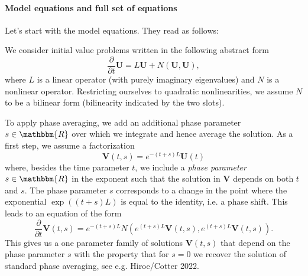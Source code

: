 \documentclass[a4,12pt]{article}
\newcommand{\pp}[2]{\frac{\partial #1}{\partial #2}}
\newcommand{\V}{\mathbf{V}}
\newcommand{\U}{\mathbf{U}}
\begin{document}
\paragraph{Model equations and full set of equations}

Let's start with the model equations. They read as follows:





\newpage






\vspace{3em}




We consider initial value problems written in the following abstract
form
\begin{equation}\label{equ_gen_U}
 \pp{}{t} \U = L\U + N(\U ,\U ),
\end{equation}
where $L$ is a linear operator (with purely imaginary eigenvalues) and
$N$ is a nonlinear operator.
Restricting ourselves to quadratic nonlinearities, we assume
$N$ to be a bilinear form (bilinearity indicated by the two slots).


To apply phase averaging, we add an additional phase parameter $s \in
\mathbbm{R}$ over which we integrate and hence average the solution.
As a first step, we assume a factorization
 \begin{equation}\label{factoring_s}
 \V(t,s) = e^{-(t+s) L} \U(t)
\end{equation}
where, besides the time parameter $t$, we include a \emph{phase
  parameter} $s\in \mathbbm{R}$ in the exponent such that the solution
in $\V$ depends on both $t$ and $s$. The phase parameter $s$
corresponds to a change in the point where the exponential
$\exp((t+s)L)$ is equal to the identity, i.e. a phase shift.
This leads to an equation of the form
\begin{equation}\label{equ_gen_V_s}
   \pp{}{t} \V(t,s) = e^{-(t+s) L} N \left(e^{ (t+s) L} \V(t,s),e^{ (t+s) L} \V(t,s)\right).
\end{equation}
This gives us a one parameter family of solutions $\V(t,s)$ that
depend on the phase parameter $s$ with the property that for $s = 0$
we recover the solution of standard phase averaging, see e.g. Hiroe/Cotter 2022.
\end{document}
